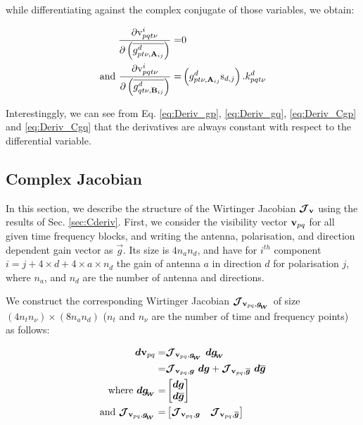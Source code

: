 \noindent while differentiating against the complex conjugate of those
variables, we obtain:

\begin{alignat}{3}
\label{eq:Deriv_Cgp}
\frac{\partial \mathrm{v}^i_{pqt\nu}}{\partial \conjp{g^{d}_{pt\nu,\textbf{A}_{ij}}}}=&0\\
\label{eq:Deriv_Cgq}
\text{and}\ 
\frac{\partial \mathrm{v}^i_{pqt\nu}}{\partial \conjp{g^{d}_{qt\nu,\textbf{B}_{ij}}}}=&
\left(g^{d}_{pt\nu,\textbf{A}_{ij}}\text{s}_{d,j}\right).k^{d}_{pqt\nu}
\end{alignat}

\noindent Interestinggly, we can see from Eq. \ref{eq:Deriv_gp},
\ref{eq:Deriv_gq}, \ref{eq:Deriv_Cgp} and \ref{eq:Deriv_Cgq} that the
derivatives are always constant with respect to the differential
variable.

\subsection{Complex Jacobian}

In this section, we describe the structure of the Wirtinger Jacobian $\bm{\mathcal{J}}_{\textbf{v}}$ using the
results of Sec. \ref{sec:Cderiv}.
First, we consider the visibility vector $\textbf{v}_{pq}$
for all given time frequency blocks, and writing the antenna,
polarisation, and direction dependent gain vector as
$\vec{g}$. Its size is $4n_an_d$, and have for $i^{th}$ component
$i=j+4\times d+4\times a \times n_d$ the gain of antenna $a$ in
direction $d$ for polarisation $j$, where $n_a$, and $n_d$ are the
number of antenna and directions.

We construct the corresponding Wirtinger Jacobian $\bm{\mathcal{J}}_{{\textbf{v}_{pq}},\bm{g_{\!_{W}}}}$ of size $(4n_t n_{\nu})\times (8n_a n_d)$ ($n_t$
and $n_{\nu}$ are the number of time and frequency points) as follows:

\begin{alignat}{2}
\label{eq:dV}
\dbf\vbl=&\JVpq\ \dbf\gwirt\\
=&\JVpqg\ \dbf\g+\JVpqCg\ \dbf\conj{\g}\\
\text{where }\dgwirt=&
\begin{bmatrix}
\dbf\vec{g}\\
\dbf\conj{\vec{g}}
\end{bmatrix}\\
\text{and }\JVpq=&
\begin{bmatrix}
\JVpqg & \JVpqCg
\end{bmatrix}
\end{alignat}

